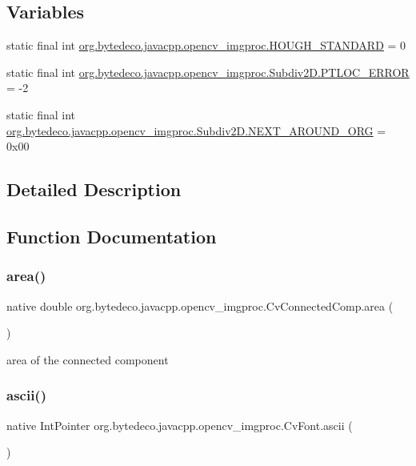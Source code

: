 \subsection*{Variables}
\begin{DoxyCompactItemize}
\item 
static final int \hyperlink{group__imgproc_ga8a1f49c921b5f1321db39c707417054d}{org.\+bytedeco.\+javacpp.\+opencv\+\_\+imgproc.\+H\+O\+U\+G\+H\+\_\+\+S\+T\+A\+N\+D\+A\+RD} = 0
\item 
static final int \hyperlink{group__imgproc_gaf2036f8d8ea03c954d0ab11577b69276}{org.\+bytedeco.\+javacpp.\+opencv\+\_\+imgproc.\+Subdiv2\+D.\+P\+T\+L\+O\+C\+\_\+\+E\+R\+R\+OR} = -\/2
\item 
static final int \hyperlink{group__imgproc_gaf83cf3be67294a0c15de36941b587526}{org.\+bytedeco.\+javacpp.\+opencv\+\_\+imgproc.\+Subdiv2\+D.\+N\+E\+X\+T\+\_\+\+A\+R\+O\+U\+N\+D\+\_\+\+O\+RG} = 0x00
\end{DoxyCompactItemize}


\subsection{Detailed Description}


\subsection{Function Documentation}
\mbox{\label{group__imgproc_ga3782e365b543229fa6197c24f96e17c7}} 
\subsubsection{\texorpdfstring{area()}{area()}}
{\footnotesize\ttfamily native double org.\+bytedeco.\+javacpp.\+opencv\+\_\+imgproc.\+Cv\+Connected\+Comp.\+area (\begin{DoxyParamCaption}{ }\end{DoxyParamCaption})}

area of the connected component \mbox{\label{group__imgproc_ga172965ffbfb59bdefa408680e0b5ff62}} 
\subsubsection{\texorpdfstring{ascii()}{ascii()}}
{\footnotesize\ttfamily native Int\+Pointer org.\+bytedeco.\+javacpp.\+opencv\+\_\+imgproc.\+Cv\+Font.\+ascii (\begin{DoxyParamCaption}{ }\end{DoxyParamCaption})}

